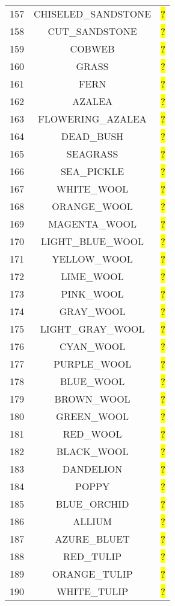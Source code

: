 \documentclass[11pt]{article}
\newcommand\myworries[1]{\sethlcolor{red}\hl{#1}}
\begin{document}
\begin{longtable}{ |c|c|c| }
157 & CHISELED\_SANDSTONE & \myworries{?} \\
158 & CUT\_SANDSTONE & \myworries{?} \\
159 & COBWEB & \myworries{?} \\
160 & GRASS & \myworries{?} \\
161 & FERN & \myworries{?} \\
162 & AZALEA & \myworries{?} \\
163 & FLOWERING\_AZALEA & \myworries{?} \\
164 & DEAD\_BUSH & \myworries{?} \\
165 & SEAGRASS & \myworries{?} \\
166 & SEA\_PICKLE & \myworries{?} \\
167 & WHITE\_WOOL & \myworries{?} \\
168 & ORANGE\_WOOL & \myworries{?} \\
169 & MAGENTA\_WOOL & \myworries{?} \\
170 & LIGHT\_BLUE\_WOOL & \myworries{?} \\
171 & YELLOW\_WOOL & \myworries{?} \\
172 & LIME\_WOOL & \myworries{?} \\
173 & PINK\_WOOL & \myworries{?} \\
174 & GRAY\_WOOL & \myworries{?} \\
175 & LIGHT\_GRAY\_WOOL & \myworries{?} \\
176 & CYAN\_WOOL & \myworries{?} \\
177 & PURPLE\_WOOL & \myworries{?} \\
178 & BLUE\_WOOL & \myworries{?} \\
179 & BROWN\_WOOL & \myworries{?} \\
180 & GREEN\_WOOL & \myworries{?} \\
181 & RED\_WOOL & \myworries{?} \\
182 & BLACK\_WOOL & \myworries{?} \\
183 & DANDELION & \myworries{?} \\
184 & POPPY & \myworries{?} \\
185 & BLUE\_ORCHID & \myworries{?} \\
186 & ALLIUM & \myworries{?} \\
187 & AZURE\_BLUET & \myworries{?} \\
188 & RED\_TULIP & \myworries{?} \\
189 & ORANGE\_TULIP & \myworries{?} \\
190 & WHITE\_TULIP & \myworries{?} \\

\end{longtable}
\end{document}
